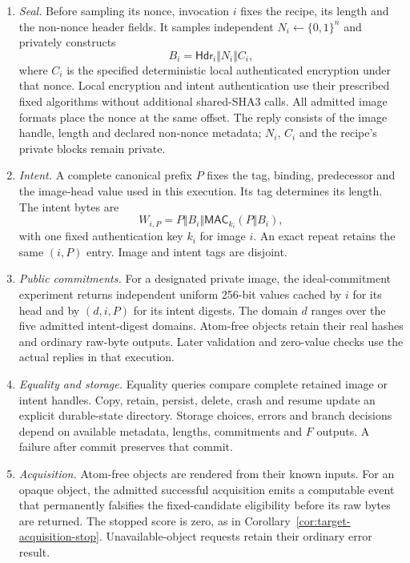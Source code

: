 \begin{enumerate}
  \item \emph{Seal.} Before sampling its nonce, invocation $i$ fixes the
  recipe, its length and the non-nonce header fields. It samples independent
  $N_i\gets\{0,1\}^{n}$ and privately constructs
  \[
    B_i=\mathsf{Hdr}_i\Vert N_i\Vert C_i,
  \]
  where $C_i$ is the specified deterministic local authenticated encryption
  under that nonce. Local encryption and intent authentication use their
  prescribed fixed algorithms without additional shared-SHA3 calls. All
  admitted image formats place the nonce at the same offset. The reply
  consists of the image handle, length and declared non-nonce metadata;
  $N_i$, $C_i$ and the recipe's private blocks remain private.
  \item \emph{Intent.} A complete canonical prefix $P$ fixes the tag,
  binding, predecessor and the image-head value used in this execution.
  Its tag determines its length. The intent bytes are
  \[
    W_{i,P}=P\Vert B_i\Vert
       \mathsf{MAC}_{k_i}(P\Vert B_i),
  \]
  with one fixed authentication key $k_i$ for image $i$. An exact repeat
  retains the same $(i,P)$ entry. Image and intent tags are disjoint.
  \item \emph{Public commitments.} For a designated private image, the
  ideal-commitment experiment returns independent uniform 256-bit values
  cached by $i$ for its head and by $(d,i,P)$ for its intent digests. The
  domain $d$ ranges over the five admitted intent-digest domains. Atom-free
  objects retain their real hashes and ordinary raw-byte outputs. Later
  validation and zero-value checks use the actual replies in that execution.
  \item \emph{Equality and storage.} Equality queries compare complete
  retained image or intent handles. Copy, retain, persist, delete, crash
  and resume update an explicit durable-state directory. Storage choices,
  errors and branch decisions depend on available metadata, lengths,
  commitments and $F$ outputs. A failure after commit preserves that commit.
  \item \emph{Acquisition.} Atom-free objects are rendered from their known
  inputs. For an opaque object, the admitted successful acquisition emits
  a computable event that permanently falsifies the fixed-candidate
  eligibility before its raw bytes are returned. The stopped score is zero,
  as in Corollary~\ref{cor:target-acquisition-stop}. Unavailable-object requests
  retain their ordinary error result.
\end{enumerate}


